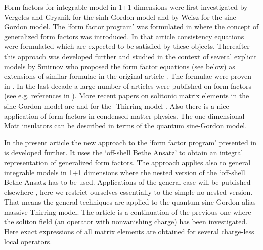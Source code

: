 \documentclass[a4paper,a4paper]{article}
\begin{document}
Form factors for integrable model in 1+1 dimensions were first investigated
by Vergeles and Gryanik \cite{VG} for the sinh-Gordon model and by Weisz 
\cite{W} for the sine-Gordon model. The `form factor program' was formulated
in \cite{KW} where the concept of generalized form factors was introduced.
In that article consistency equations were formulated which are expected to
be satisfied by these objects. Thereafter this approach was developed
further and studied in the context of several explicit models by Smirnov 
\cite{Sm} who proposed the form factor equations \coordHE{} (see below) as
extensions of similar formulae in the original article \cite{KW}. The
formulae were proven in \cite{BFKZ}. In the last decade a large number of
articles were published on form factors (see e.g. references in \cite{BFKZ}%
). More recent papers on solitonic matrix elements in the sine-Gordon model
are \cite{Lu,LZ} and for the \coordHE{}-Thirring model \cite{KLP,NPT,NT}. Also
there is a nice application \cite{GNT,CET} of form factors in condensed
matter physics. The one dimensional Mott insulators can be described in
terms of the quantum sine-Gordon model.

In the present article the new approach to the `form factor program'
presented in \cite{BFKZ} is developed further. It uses the `off-shell Bethe
Ansatz' to obtain an integral representation of generalized form factors.
The approach applies also to general integrable models in 1+1 dimensions
where the nested version \cite{BKZ} of the `off-shell Bethe Ansatz has to be
used. Applications of the general case will be published elsewhere \cite
{BFKZ1,BK3}, here we restrict ourselves essentially to the simple no-nested
version. That means the general techniques are applied to the quantum
sine-Gordon alias massive Thirring model. The article is a continuation of
the previous one \cite{BFKZ} where the soliton field (an operator with
nonvanishing charge) has been investigated. Here exact expressions of all
matrix elements are obtained for several charge-less local operators.
\end{document}
